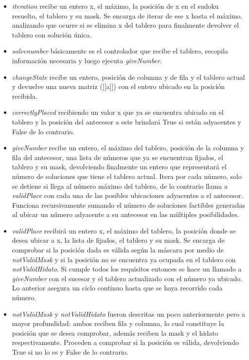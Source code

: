 \documentclass[10pt]{amsart}
\begin{document}
    \begin{itemize}
        \item \textit{iteration} recibe un entero x, el m\'aximo, la posici\'on de x en el sudoku resuelto, el tablero y su mask. Se encarga de iterar de ese x hasta el m\'aximo, analizando que ocurre si se elimina x del tablero para finalmente devolver el tablero con soluci\'on \'unica.
        \item \textit{solvenumber} b\'asicamente es el controlador que recibe el tablero, recopila informaci\'on necesaria y luego ejecuta \textit{giveNumber}.
        \item \textit{changeState} recibe un entero, posici\'on de columna y de fila y el tablero actual y devuelve una nueva matriz ([[a]]) con el entero ubicado en la posici\'on recibida.
        \item \textit{correctlyPlaced} recibiendo un valor x que ya se encuentra ubicado en el tablero y la posici\'on del antecesor a este brindar\'a True si est\'an adyacentes y False de lo contrario.
        \item \textit{giveNumber}  recibe un entero, el m\'aximo del tablero, posici\'on de la columna y fila del antecesor, una lista de números que ya se encuentran fijados, el tablero y su mask, devolviendo finalmente un entero que representar\'a el n\'umero de soluciones que tiene el tablero actual. Itera por cada n\'umero, solo se detiene si llega al número m\'aximo del tablero, de lo contrario llama a \textit{validPlace} con cada una de las posibles ubicaciones adyacentes a el antecesor. Funciona recursivamente sumando el n\'umero de soluciones factibles generadas al ubicar un n\'umero adyacente a su antecesor en las m\'ultiples posibilidades.
		\item \textit{validPlace} recibir\'a un entero x, el m\'aximo del tablero, la posici\'on donde se desea ubicar a x, la lista de fijados, el tablero y su mask. Se encarga de comprobar si la posici\'on dada es v\'alida seg\'un la m\'ascara por medio de \textit{notValidMask} y si la posici\'on no se encuentra ya ocupada en el tablero con \textit{notValidHidato}. Si cumple todos los requisitos entonces se hace un llamado a \textit{giveNumber} con el sucesor y el tablero actualizado con el n\'umero ya ubicado. Lo anterior asegura un ciclo continuo hasta que se haya recorrido cada n\'umero.
		\item \textit{notValidMask} y \textit{notValidHidato} fueron descritas un poco anteriormente pero a mayor profundidad: ambos reciben fila y columna, lo cual constituye la posici\'on que se desea comprobar, adem\'as reciben la mask y el hidato respectivamente. Proceden a comprobar si la posici\'on es v\'alida, devolviendo True si no lo es y False de lo contrario.
    \end{itemize}
	 
\end{document}
